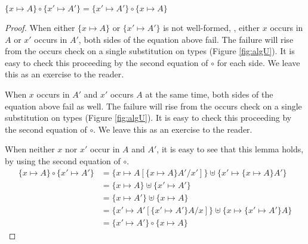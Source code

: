 \begin{lemma}\label{lem:commsinglesinglesubst}
$ \{x\mapsto A\}\circ\{x'\mapsto A'\} = \{x'\mapsto A'\}\circ\{x\mapsto A\} $
\end{lemma}
\begin{proof}
When either $\{x\mapsto A\}$ or $\{x'\mapsto A'\}$ is not well-formed,
\ie, either $x$ occurs in $A$ or $x'$ occurs in $A'$,
both sides of the equation above fail. The failure will rise from
the occurs check on a single substitution on types (Figure \ref{fig:algU}).
It is easy to check this proceeding by the second equation of $\circ$
for each side. We leave this as an exercise to the reader.

When $x$ occurs in $A'$ and $x'$ occurs $A$ at the same time,
both sides of the equation above fail as well. The failure will rise from
the occurs check on a single substitution on types (Figure \ref{fig:algU}).
It is easy to check this proceeding by the second equation of $\circ$.
We leave this as an exercise to the reader.

When neither $x$ nor $x'$ occur in $A$ and $A'$, it is easy to see
that this lemma holds, by using the second equation of $\circ$.
\begin{align*}
\{x\mapsto A\}\circ\{x'\mapsto A'\}
&= \{x\mapsto A[\{x\mapsto A\} A'/x']\}\uplus\{x'\mapsto\{x\mapsto A\} A'\} \\
&= \{x\mapsto A\}\uplus\{x'\mapsto A'\} \\
&= \{x\mapsto A'\}\uplus\{x\mapsto A\} \\
&= \{x'\mapsto A'[\{x'\mapsto A'\}A/x]\}\uplus\{x\mapsto\{x'\mapsto A'\}A\} \\
&= \{x'\mapsto A'\}\circ\{x\mapsto A\}
\end{align*}


\end{proof}
